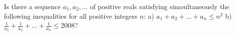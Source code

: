 Is there a sequence $ a_1,a_2,\ldots$ of positive reals satisfying simoultaneously the following inequalities for all positive integers $ n$:
a) $ a_1+a_2+\ldots+a_n\le n^2$
b) $ \frac1{a_1}+\frac1{a_2}+\ldots+\frac1{a_n}\le2008$?